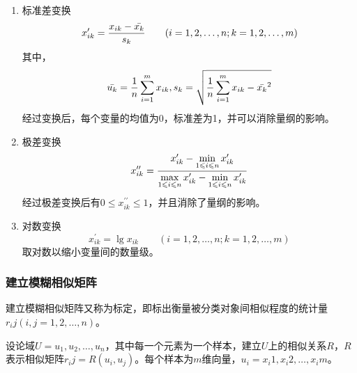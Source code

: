 \begin{enumerate}[label=（\arabic*）]
	\item 标准差变换
		\begin{equation}
			x_{ik}^\prime = {x_{ik} - \bar{x_k} \over s_k} 
			\qquad (i = 1,2,\dots,n;k = 1,2,\dots,m)
		\end{equation}
		其中，$$\bar{u_k} = {1\over n} \sum_{i=1}^{m}x_{ik}, s_k = \sqrt{ {1\over n}\sum_{i=1}^{m}{x_{ik} - \bar{x_k}}^2 }$$经过变换后，每个变量的均值为0，标准差为1，并可以消除量纲的影响。
	\item 极差变换
		\begin{equation}
			 x_{ik}^{\prime\prime} = {
			 	x_{ik}^\prime-\min\limits_{1 \leqslant i \leqslant n}{x_{ik}^\prime}
			 	\over 
			 	\max\limits_{1 \leqslant i \leqslant n}{x_{ik}^\prime}-\min\limits_{1 \leqslant i \leqslant n}{x_{ik}^\prime}}
		\end{equation}
		经过极差变换后有$0 \leqslant x_{ik}^{\prime\prime} \leqslant 1$，并且消除了量纲的影响。
	\item 对数变换
		\begin{equation}
			x_{ik}^\prime = \lg x_{ik} \qquad (i = 1,2,\dots,n;k = 1,2,\dots,m)
		\end{equation}
		取对数以缩小变量间的数量级。
\end{enumerate}

\subsubsection{建立模糊相似矩阵}
建立模糊相似矩阵又称为标定，即标出衡量被分类对象间相似程度的统计量$r_ij (i,j=1,2,\dots,n)$。

设论域$U={u_1,u_2,\dots,u_n}$，其中每一个元素为一个样本，建立$U$上的相似关系$R$，$R $表示相似矩阵$r_ij=R(u_i,u_j)$。每个样本为$m$维向量，$u_i={x_i1,x_i2,\dots,x_im}$。

